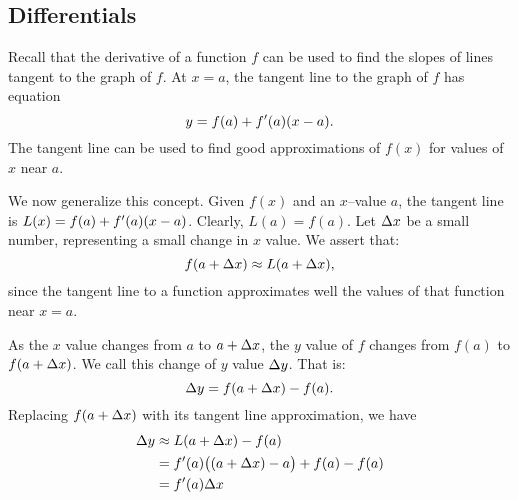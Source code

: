 \subsection*{Differentials}

Recall that the derivative of a function $f$ can be used to find the slopes of lines tangent to the graph of $f$. At $x=a$, the tangent line to the graph of $f$ has equation $$y = f(a) + f'(a)(x-a).$$
The tangent line can be used to find good approximations of $f(x)$ for values of $x$ near $a$. 

%
%
%
%

We now generalize this concept. Given $f(x)$ and an $x$--value $a$,  the tangent line is $L(x) = f(a) + f'(a)(x-a)$. Clearly, $L(a) = f(a)$. Let $\Delta x$ be a small number, representing a small change in $x$ value. We assert that:
$$f(a+\Delta x) \approx L(a+\Delta x),$$ since the tangent line to a function approximates well the values of that function near $x=a$. 

As the $x$ value changes from $a$ to $a+\Delta x$, the $y$ value of $f$ changes from $f(a)$ to $f(a+\Delta x)$. We call this change of $y$ value $\Delta y$. That is:
$$\Delta y = f(a+\Delta x)-f(a).$$
Replacing $f(a+\Delta x)$ with its tangent line approximation, we have 
\begin{align} \Delta y &\approx L(a+\Delta x) - f(a) \notag\\
&= f'(a)\big((a+\Delta x)-a\big)+f(a) - f(a)\notag \\
&=f'(a)\Delta x		\label{eq:differential}
\end{align}

